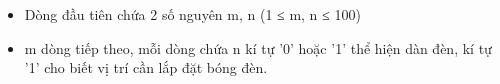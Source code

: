 \begin{itemize}
	\item     Dòng đầu tiên chứa 2 số nguyên m, n (1 ≤ m, n ≤ 100)   
	\item     m dòng tiếp theo, mỗi dòng chứa n kí tự '0' hoặc '1' thể hiện dàn đèn, kí tự '1' cho biết vị trí cần lắp đặt bóng đèn.   
\end{itemize}